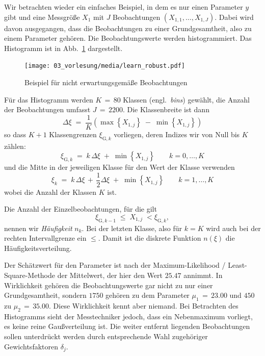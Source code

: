 Wir betrachten wieder ein einfaches Beispiel, in dem es nur einen Parameter $y$ gibt und eine
Messgröße $X_1$ mit $J$ Beobachtungen $(X_{1,1},\dots,X_{1,J})$.
Dabei wird davon ausgegangen, dass die Beobachtungen zu einer Grundgesamtheit, also zu einem Parameter gehören.
Die Beobachtungswerte werden histogrammiert. Das Histogramm ist in Abb.~\ref{biasExampleKap3} dargestellt.
\begin{figure}
\begin{center}
\texttt{[image: 03\_vorlesung/media/learn\_robust.pdf]}
\caption{Beispiel für nicht erwartungsgemäße Beobachtungen}
\label{biasExampleKap3}
\end{center}
\end{figure}
Für das Histogramm werden $K \, = \, 80$ Klassen (engl.\ \textsl{bins}) gewählt, die Anzahl der Beobachtungen umfasst $J \, = \, 2200$.
Die Klassenbreite ist dann
\begin{equation}
\Delta \xi \; = \; \frac{1}{K} \left( \max \left\{X_{1,j}\right\} \; - \; \min \left\{X_{1,j}\right\} \right)
\end{equation}
so dass $K+1$ Klassengrenzen $\xi_{\mathrm{G}, k}$ vorliegen,
deren Indizes wir von Null bis $K$ zählen:
\begin{equation}
 \xi_{\mathrm{G}, k} \; = \; k \, \Delta \xi \; + \; \min \left\{X_{1,j}\right\}
\qquad k = 0, \dots, K
\label{limkthbin}
\end{equation}
und die Mitte in der jeweiligen Klasse für den Wert der Klasse verwenden
\begin{equation}
 \xi_k \; = \; k \, \Delta \xi  \, + \, \frac{1}{2} \Delta \xi  \; + \; \min \left\{X_{1,j}\right\}
\qquad k = 1, \dots, K
\label{kthbin}
\end{equation}
wobei die Anzahl der Klassen $K$ ist.

Die Anzahl der Einzelbeobachtungen, für die gilt
\begin{equation}
\xi_{\mathrm{G}, k-1} \; \leq \; X_{1,j} \; <  \xi_{\mathrm{G}, k},
\end{equation}
nennen wir \textsl{Häufigkeit} $n_k$. Bei der letzten Klasse, also für
$k = K$ wird auch bei der rechten Intervallgrenze ein $\leq$.
Damit ist die diskrete Funktion $n(\xi)$ die Häufigkeitsverteilung.

Der Schätzwert für den Parameter ist nach der Maximum-Likelihood / Least-Square-Methode der
Mittelwert, der hier den Wert $25.47$ annimmt. In Wirklichkeit gehören die Beobachtungswerte gar nicht zu
nur einer Grundgesamtheit, sondern $1750$ gehören zu dem Parameter $\mu_1 \, = \, 23.00$ und $450$ zu $\mu_2 \, = \, 35.00$.
Diese Wirklichkeit kennt aber niemand. Bei Betrachten des Histogramms sieht der Messtechniker jedoch, dass ein
Nebenmaximum vorliegt, es keine reine Gaußverteilung ist. Die weiter entfernt liegenden Beobachtungen sollen unterdrückt werden
durch entsprechende Wahl zugehöriger Gewichtsfaktoren $\delta_j$.

